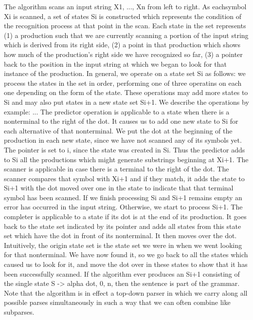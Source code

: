 \begin{isabellebody}
\begin{isamarkuptext}
The algorithm scans an input string X1, ..., Xn from left to right. As eachsymbol Xi is scanned, a set of
states Si is constructed which represents the condition of the recognition process at that point in the
scan. Each state in the set represents (1) a production such that we are currently scanning a portion of
the input string which is derived from its right side, (2) a point in that production which shows how much of the
production's right side we have recognized so far, (3) a pointer back to the position in the input string
at which we began to look for that instance of the production. In general, we operate on a state set Si as follows:
we process the states in the set in order, performing one of three operatins on each one depending on the form
of the state. These operations may add more states to Si and may also put states in a new state set Si+1. We
describe the operations by example: ... The predictor operation is applicable to a state when there is a nonterminal
to  the right of the dot. It causes us to add one new state to Si for each alternative of that nonterminal.
We put the dot at the beginning of the production in each new state, since we have not scanned any of its symbols yet.
The pointer is set to i, since the state was created in Si. Thus the predictor adds to Si all the productions
which might generate substrings beginning at Xi+1. The scanner is applicable in case there is a terminal to the right
of the dot. The scanner compares that symbol with Xi+1 and if they match, it adds the state to Si+1 with the dot
moved over one in the state to indicate that that terminal symbol has been scanned. If we finish processing Si and
Si+1 remains empty an error has occurred in the input string. Otherwise, we start to process Si+1.
The completer is applicable to a state if its dot is at the end of its production. It goes back to the state set
indicated by its pointer and adds all states from this state set which have the dot in front of its nonterminal.
It then moves over the dot. Intuitively, the origin state set is the state set we were in when we went looking
for that nonterminal. We have now found it, so we go back to all the states which caused us to look for it, and move
the dot over in these states to show that it has been successfully scanned. If the algorithm ever produces an Si+1
consisting of the single state S -> alpha dot, 0, n, then the sentence is part of the grammar. Note that the algorithm
is in effect a top-down parser in which we carry along all possible parses simultaneously in such a way that we can often
combine like subparses.


\end{isamarkuptext}
\end{isabellebody}
